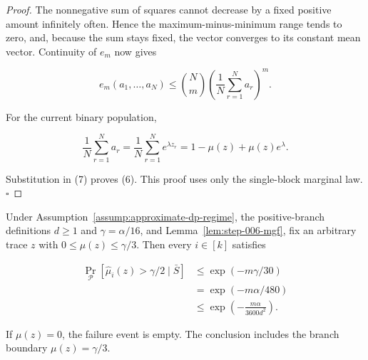 \begin{proof}
The nonnegative sum of squares cannot decrease by a fixed positive amount
infinitely often.  Hence the maximum-minus-minimum range tends to zero, and,
because the sum stays fixed, the vector converges to its constant mean
vector.  Continuity of \(e_m\) now gives

\[
 e_m(a_1,\ldots,a_N)
 \leq\binom Nm\left(\frac1N\sum_{r=1}^N a_r\right)^m.
\tag{9}
\]

For the current binary population,

\[
 \frac1N\sum_{r=1}^N a_r
 =\frac1N\sum_{r=1}^N e^{\lambda z_r}
 =1-\mu(z)+\mu(z)e^\lambda.
\]

Substitution in (7) proves (6).  This proof uses only the single-block
marginal law. \(\square\)


\end{proof}

\begin{lemma}\label{lem:step-006-low-tail}
Under Assumption~\ref{assump:approximate-dp-regime}, the positive-branch
definitions \(d\geq1\) and \(\gamma=\alpha/16\), and
Lemma~\ref{lem:step-006-mgf}, fix an arbitrary trace \(z\) with
\(0\leq\mu(z)\leq\gamma/3\).  Then every \(i\in[k]\) satisfies

\[
\begin{aligned}
 \Pr_{\mathcal P}
 [\widehat\mu_i(z)>\gamma/2\mid\bar S]
 &\leq \exp(-m\gamma/30)\\
 &=\exp(-m\alpha/480)\\
 &\leq\exp\!\left(-\frac{m\alpha}{3600d^2}\right).
\end{aligned}
\tag{10}
\]

If \(\mu(z)=0\), the failure event is empty.  The conclusion includes the
branch boundary \(\mu(z)=\gamma/3\).


\end{lemma}

